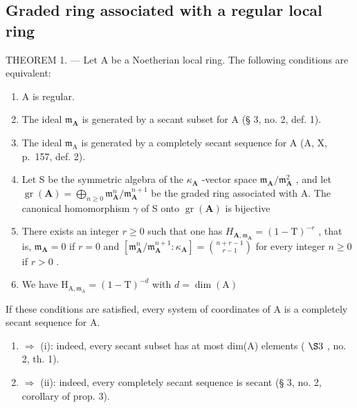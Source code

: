 \subsection{Graded ring associated with a regular local ring}

THEOREM 1. --- Let A be a Noetherian local ring. The following conditions are equivalent:

\begin{enumerate}
\def\labelenumi{(\roman{enumi})}
\item
  A is regular.
\item
  The ideal \(\mathfrak{m}_{\mathbf{A}}\) is generated by a secant subset for A (§ 3, no. 2, def. 1).
\item
  The ideal \(\mathfrak{m}_{\mathrm{A}}\) is generated by a completely secant sequence for A (A, X, p.~157, def. 2).
\item
  Let S be the symmetric algebra of the \(\kappa_{\mathbf{A}}\) -vector space \(\mathfrak{m}_{\mathbf{A}} / \mathfrak{m}_{\mathbf{A}}^{2}\) , and let \(\operatorname{gr}(\mathbf{A}) = \bigoplus_{n \geqslant 0} \mathfrak{m}_{\mathbf{A}}^{n} / \mathfrak{m}_{\mathbf{A}}^{n+1}\) be the graded ring associated with A. The canonical homomorphism \(\gamma\) of S onto \(\operatorname{gr}(\mathbf{A})\) is bijective
\item
  There exists an integer \(r \geqslant 0\) such that one has \(H_{\mathbf{A},\mathfrak{m}_{\mathbf{A}}} = (1 - \mathrm{T})^{-r}\) , that is, \(\mathfrak{m}_{\mathbf{A}} = 0\) if \(r = 0\) and \([\mathfrak{m}_{\mathbf{A}}^{n}/\mathfrak{m}_{\mathbf{A}}^{n+1}:\kappa_{\mathbf{A}}] = \binom{n + r - 1}{r - 1}\) for every integer \(n \geqslant 0\) if \(r > 0\) .
\item
  We have \(\mathrm{H}_{\mathrm{A},\mathfrak{m}_{\mathrm{A}}} = (1 - \mathrm{T})^{-d}\) with \(d = \dim (\mathrm{A})\)
\end{enumerate}

If these conditions are satisfied, every system of coordinates of A is a completely secant sequence for A.

\begin{enumerate}
\def\labelenumi{(\roman{enumi})}
\setcounter{enumi}{1}
\item
  \(\Rightarrow\) (i): indeed, every secant subset has at most dim(A) elements ( \(\S 3\) , no. 2, th. 1).
\item
  \(\Rightarrow\) (ii): indeed, every completely secant sequence is secant (§ 3, no. 2, corollary of prop. 3).
\end{enumerate}

